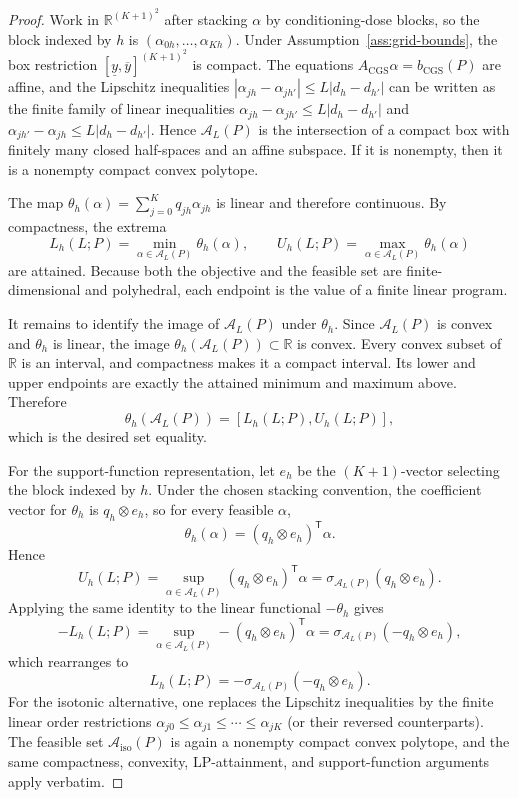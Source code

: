 \documentclass[11pt]{article}
\newcommand{\transpose}{\mathsf{T}}
\newcommand{\R}{\mathbb{R}}
\theoremstyle{definition}
\theoremstyle{plain}
\theoremstyle{remark}
\begin{document}
\begin{proof}
Work in \(\R^{(K+1)^2}\) after stacking \(\alpha\) by conditioning-dose blocks, so the block indexed by \(h\) is \((\alpha_{0h},\ldots,\alpha_{Kh})\).  Under Assumption~\ref{ass:grid-bounds}, the box restriction \([\underline y,\overline y]^{(K+1)^2}\) is compact.  The equations \(A_{\mathrm{CGS}}\alpha=b_{\mathrm{CGS}}(P)\) are affine, and the Lipschitz inequalities \(|\alpha_{jh}-\alpha_{jh'}|\le L|d_h-d_{h'}|\) can be written as the finite family of linear inequalities \(\alpha_{jh}-\alpha_{jh'}\le L|d_h-d_{h'}|\) and \(\alpha_{jh'}-\alpha_{jh}\le L|d_h-d_{h'}|\).  Hence \(\mathcal A_L(P)\) is the intersection of a compact box with finitely many closed half-spaces and an affine subspace.  If it is nonempty, then it is a nonempty compact convex polytope.

The map \(\theta_h(\alpha)=\sum_{j=0}^K q_{jh}\alpha_{jh}\) is linear and therefore continuous.  By compactness, the extrema
\[
  L_h(L;P)=\min_{\alpha\in\mathcal A_L(P)}\theta_h(\alpha),
  \qquad
  U_h(L;P)=\max_{\alpha\in\mathcal A_L(P)}\theta_h(\alpha)
\]
are attained.  Because both the objective and the feasible set are finite-dimensional and polyhedral, each endpoint is the value of a finite linear program.

It remains to identify the image of \(\mathcal A_L(P)\) under \(\theta_h\).  Since \(\mathcal A_L(P)\) is convex and \(\theta_h\) is linear, the image \(\theta_h(\mathcal A_L(P))\subset\R\) is convex.  Every convex subset of \(\R\) is an interval, and compactness makes it a compact interval.  Its lower and upper endpoints are exactly the attained minimum and maximum above.  Therefore
\[
  \theta_h(\mathcal A_L(P))=[L_h(L;P),U_h(L;P)],
\]
which is the desired set equality.

For the support-function representation, let \(e_h\) be the \((K+1)\)-vector selecting the block indexed by \(h\).  Under the chosen stacking convention, the coefficient vector for \(\theta_h\) is \(q_h\otimes e_h\), so for every feasible \(\alpha\),
\[
  \theta_h(\alpha)=(q_h\otimes e_h)^\transpose \alpha.
\]
Hence
\[
  U_h(L;P)=\sup_{\alpha\in\mathcal A_L(P)}(q_h\otimes e_h)^\transpose\alpha
  =\sigma_{\mathcal A_L(P)}(q_h\otimes e_h).
\]
Applying the same identity to the linear functional \(-\theta_h\) gives
\[
  -L_h(L;P)=\sup_{\alpha\in\mathcal A_L(P)}-(q_h\otimes e_h)^\transpose\alpha
  =\sigma_{\mathcal A_L(P)}(-q_h\otimes e_h),
\]
which rearranges to
\[
  L_h(L;P)=-\sigma_{\mathcal A_L(P)}(-q_h\otimes e_h).
\]
For the isotonic alternative, one replaces the Lipschitz inequalities by the finite linear order restrictions \(\alpha_{j0}\le\alpha_{j1}\le\cdots\le\alpha_{jK}\) (or their reversed counterparts).  The feasible set \(\mathcal A_{\mathrm{iso}}(P)\) is again a nonempty compact convex polytope, and the same compactness, convexity, LP-attainment, and support-function arguments apply verbatim.
\end{proof}
\end{document}
